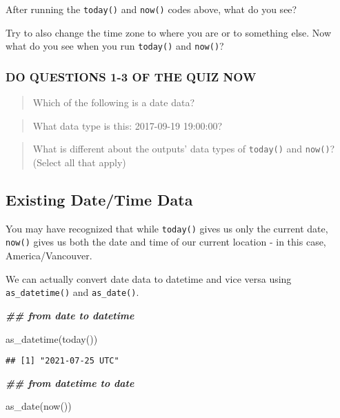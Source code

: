 \documentclass[
]{book}
\newenvironment{Shaded}{\begin{snugshade}}{\end{snugshade}}
\newcommand{\DocumentationTok}[1]{\textcolor[rgb]{0.56,0.35,0.01}{\textbf{\textit{#1}}}}
\newcommand{\FunctionTok}[1]{\textcolor[rgb]{0.00,0.00,0.00}{#1}}
\newcommand{\NormalTok}[1]{#1}
\begin{document}
After running the \texttt{today()} and \texttt{now()} codes above, what do you see?

Try to also change the time zone to where you are or to something else. Now what do you see when you run \texttt{today()} and \texttt{now()}?

\hypertarget{do-questions-1-3-of-the-quiz-now}{%
\subsubsection{DO QUESTIONS 1-3 OF THE QUIZ NOW}\label{do-questions-1-3-of-the-quiz-now}}

\begin{quote}
Which of the following is a date data?
\end{quote}

\begin{quote}
What data type is this: 2017-09-19 19:00:00?
\end{quote}

\begin{quote}
What is different about the outputs' data types of \texttt{today()} and \texttt{now()}? (Select all that apply)
\end{quote}

\hypertarget{existing-datetime-data}{%
\subsection{Existing Date/Time Data}\label{existing-datetime-data}}

You may have recognized that while \texttt{today()} gives us only the current date, \texttt{now()} gives us both the date and time of our current location - in this case, America/Vancouver.

We can actually convert date data to datetime and vice versa using \texttt{as\_datetime()} and \texttt{as\_date()}.

\begin{Shaded}
\begin{Highlighting}[]
\DocumentationTok{\#\# from date to datetime}

\FunctionTok{as\_datetime}\NormalTok{(}\FunctionTok{today}\NormalTok{())}
\end{Highlighting}
\end{Shaded}

\begin{verbatim}
## [1] "2021-07-25 UTC"
\end{verbatim}

\begin{Shaded}
\begin{Highlighting}[]
\DocumentationTok{\#\# from datetime to date}

\FunctionTok{as\_date}\NormalTok{(}\FunctionTok{now}\NormalTok{())}
\end{Highlighting}
\end{Shaded}
\end{document}
